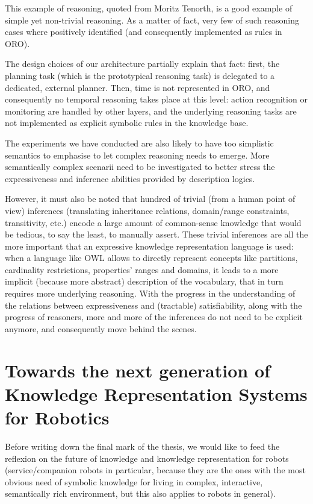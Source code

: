 This example of reasoning, quoted from Moritz Tenorth, is a good example of
simple yet non-trivial reasoning. As a matter of fact, very few of such
reasoning cases where positively identified (and consequently implemented as
rules in ORO).

The design choices of our architecture partially explain that fact: first, the
planning task (which is the prototypical reasoning task) is delegated to a
dedicated, external planner. Then, time is not represented in ORO, and
consequently no temporal reasoning takes place at this level: action
recognition or monitoring are handled by other layers, and the underlying
reasoning tasks are not implemented as explicit symbolic rules in the knowledge
base.

The experiments we have conducted are also likely to have too simplistic
semantics to emphasise to let complex reasoning needs to emerge. More
semantically complex scenarii need to be investigated to better stress the
expressiveness and inference abilities provided by description logics.

However, it must also be noted that hundred of trivial (from a human point of
view) inferences (translating inheritance relations, domain/range constraints,
transitivity, etc.) encode a large amount of common-sense knowledge that would
be tedious, to say the least, to manually assert. These trivial inferences are
all the more important that an expressive knowledge representation language is
used: when a language like OWL allows to directly represent concepts like
partitions, cardinality restrictions, properties' ranges and domains, it leads
to a more implicit (because more abstract) description of the vocabulary, that
in turn requires more underlying reasoning. With the progress in the
understanding of the relations between expressiveness and (tractable)
satisfiability, along with the progress of reasoners, more and more of the
inferences do not need to be explicit anymore, and consequently move behind the
scenes.

\section{Towards the next generation of Knowledge Representation Systems for Robotics}
\label{sect|perspectives}


Before writing down the final mark of the thesis, we would like to feed the
reflexion on the future of knowledge and knowledge representation for robots
(service/companion robots in particular, because they are the ones with the
most obvious need of symbolic knowledge for living in complex, interactive,
semantically rich environment, but this also applies to robots in general).

